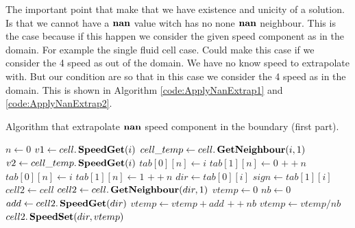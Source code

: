 The important point that make that we have existence and unicity of a solution.
Is that we cannot have a $\mathop{\textbf{nan}}$ value witch has no none $\mathop{\textbf{nan}}$ neighbour.
This is the case because if this happen we consider the given speed component as in the domain.
For example the single fluid cell case. Could make this case if we consider the 4 speed as out of the domain.
We have no know speed to extrapolate with. But our condition are so that in this case we consider the 4 speed as in the domain.
This is shown in Algorithm \ref{code:ApplyNanExtrap1} and \ref{code:ApplyNanExtrap2}.
\begin{algorithm}
\caption{Algorithm that extrapolate $\mathop{\textbf{nan}}$ speed component in the boundary (first part).}
\label{code:ApplyNanExtrap1}
\begin{algorithmic}[1]
	\State $n \gets 0$
	\State $v1 \gets cell.\mathop{\textbf{SpeedGet}}(i)$
	\State $cell\_temp \gets cell.\mathop{\textbf{GetNeighbour}}(i,1)$
	\State $v2 \gets cell\_temp.\mathop{\textbf{SpeedGet}}(i)$
		\State $tab[0][n] \gets i$
		\State $tab[1][n] \gets 0$
		\State $++n$
	\EndIf
		\State $tab[0][n]\gets i$
		\State $tab[1][n] \gets 1$
		\State $++n$
	\EndIf
	\EndFor
	 
	\Return
	\EndIf
	 
	\State $dir \gets tab[0][i]$
	\State $sign \gets tab[1][i]$
	\State $cell2\gets cell$
	\State $cell2 \gets cell.\mathop{\textbf{GetNeighbour}}(dir,1)$
	\EndIf
	\State $vtemp \gets 0$
	\State $nb \gets 0$
		\State $add \gets cell2.\mathop{\textbf{SpeedGet}}(dir)$
			\State $vtemp \gets vtemp+add $
			\State $++nb$
		\EndIf
		\EndFor
	\EndFor
		\State $vtemp \gets vtemp/nb$ 
	\EndIf
	\State $cell2.\mathop{\textbf{SpeedSet}}(dir,vtemp)$
	\EndFor
	\end{algorithmic}
\end{algorithm}
